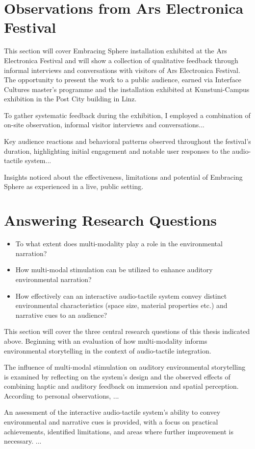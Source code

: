     \section{Observations from Ars Electronica Festival}
        This section will cover Embracing Sphere installation exhibited at the Ars Electronica Festival and will show a collection of qualitative feedback through informal interviews and conversations with visitors of Ars Electronica Festival. The opportunity to present the work to a public audience, earned via Interface Cultures master's programme and the installation exhibited at Kunstuni-Campus exhibition in the Post City building in Linz.\par

        To gather systematic feedback during the exhibition, I employed a combination of on-site observation, informal visitor interviews and conversations...\par

        Key audience reactions and behavioral patterns observed throughout the festival’s duration, highlighting initial engagement and notable user responses to the audio-tactile system...\par

        Insights noticed about the effectiveness, limitations and potential of Embracing Sphere as experienced in a live, public setting.\par
    \section{Answering Research Questions}
        \begin{itemize}
            \item To what extent does multi-modality play a role in the environmental narration?
            \item How multi-modal stimulation can be utilized to enhance auditory environmental narration?
            \item How effectively can an interactive audio-tactile system convey distinct environmental characteristics (space size, material properties etc.) and narrative cues to an audience?
        \end{itemize}

        This section will cover the three central research questions of this thesis indicated above. Beginning with an evaluation of how multi-modality informs environmental storytelling in the context of audio-tactile integration.\par

        The influence of multi-modal stimulation on auditory environmental storytelling is examined by reflecting on the system’s design and the observed effects of combining haptic and auditory feedback on immersion and spatial perception. According to personal observations, ...\par

        An assessment of the interactive audio-tactile system’s ability to convey environmental and narrative cues is provided, with a focus on practical achievements, identified limitations, and areas where further improvement is necessary. ...\par